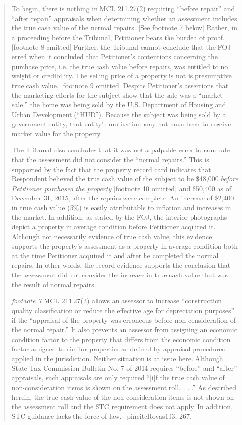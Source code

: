 \documentclass[12pt,\documentclassflag]{michiganCourtOfAppealsBrief}
\begin{document}
\begin{quotation}
To begin, there is nothing in MCL 211.27(2) requiring ``before repair'' and ``after repair'' appraisals when determining whether an assessment includes the true cash value of the normal repairs. [See footnote 7 below] Rather, in a proceeding before the Tribunal, Petitioner bears the burden of proof. [footnote 8 omitted] Further, the Tribunal cannot conclude that the FOJ erred when it concluded that Petitioner's contentions concerning the purchase price, i.e. the true cash value before repairs, was entitled to no weight or credibility. The selling price of a property is not is presumptive true cash value. [footnote 9 omitted] Despite Petitioner's assertions that the marketing efforts for the subject show that the sale was a ``market sale,'' the home was being sold by the U.S. Department of Housing and Urban Development (``HUD''). Because the subject was being sold by a government entity, that entity's motivation may not have been to receive market value for the property.

The Tribunal also concludes that it was not a palpable error to conclude that the assessment did not consider the ``normal repairs.'' This is supported by the fact that the property record card indicates that Respondent believed the true cash value of the subject to be \$48,000 \textit{before Petitioner purchased the property} [footnote 10 omitted] and \$50,400 as of December 31, 2015, after the repairs were complete. An increase of \$2,400 in true cash value (5\%) is easily attributable to inflation and increases in the market. In addition, as stated by the FOJ, the interior photographs depict a property in average condition before Petitioner acquired it. Although not necessarily evidence of true cash value, this evidence supports the property's assessment as a property in average condition both at the time Petitioner acquired it and after he completed the normal repairs. In other words, the record evidence supports the conclusion that the assessment did not consider the increase in true cash value that was the result of normal repairs.

\textit{footnote 7} MCL 211.27(2) allows an assessor to increase ``construction quality classification or reduce the effective age for depreciation purposes'' if the ``appraisal of the property was erroneous before non-consideration of the normal repair.'' It also prevents an assessor from assigning an economic condition factor to the property that differs from the economic condition factor assigned to similar properties as defined by appraisal procedures applied in the jurisdiction. Neither situation is at issue here. Although State Tax Commission Bulletin No. 7 of 2014 requires ``before'' and ``after'' appraisals, such appraisals are only required ``[i]f the true cash value of non-consideration items is shown on the assessment roll. . . .'' As described herein, the true cash value of the non-consideration items is not shown on the assessment roll and the STC requirement does not apply. In addition, STC guidance lacks the force of law. \ pincite{Rovas}{103; 267}.

\end{quotation}
\end{document}

